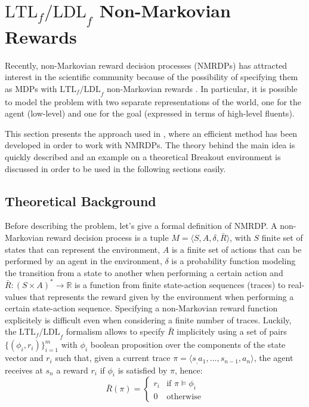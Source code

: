 \section{$\text{LTL}_f\text{/LDL}_f$ Non-Markovian Rewards}
Recently, non-Markovian reward decision processes (NMRDPs)
has attracted interest in the scientific community because of the possibility
of specifying them as MDPs with $\text{LTL}_f\text{/LDL}_f$ non-Markovian
rewards \cite{DBLP:journals/corr/abs-1807-06333}. In particular, it is possible
to model the problem with two separate representations of the world, one for
the agent (low-level) and one for the goal (expressed in terms of high-level
fluents).

This section presents the approach used in
\cite{DBLP:journals/corr/abs-1807-06333}, where an efficient method has been
developed in order to work with NMRDPs. The theory behind the main idea is
quickly described and an example on a theoretical Breakout environment is
discussed in order to be used in the following sections easily.

\subsection{Theoretical Background}
Before describing the problem, let's give a formal definition of NMRDP.
A non-Markovian reward decision process is a tuple $M = \langle S, A, \delta,
\bar{R} \rangle$, with $S$ finite set of states that can represent the
environment, $A$ is a finite set of actions that can be performed by an agent
in the environment, $\delta$ is a probability function modeling
the transition from a state to another when performing a certain action and
$\bar{R}: (S \times A)^* \rightarrow \mathbb{R}$ is a function from
finite state-action sequences (traces) to real-values that represents the
reward given by the environment when performing a certain state-action
sequence. Specifying a non-Markovian reward function explicitely is
difficult even when considering a finite number of traces. Luckily, the
$\text{LTL}_f\text{/LDL}_f$ formalism allows to specify $\bar{R}$
implicitely using a set of pairs $\{ (\phi_i, r_i) \}_{i=1}^m$ with
$\phi_i$ boolean
proposition over the components of the state vector and $r_i$ such that,
given a current trace $\pi = \langle s_, a_1, \dots, s_{n-1}, a_n \rangle$,
the agent receives at $s_n$ a reward $r_i$ if $\phi_i$ is satisfied by $\pi$,
hence:
\begin{equation}
    \bar{R}(\pi) =
        \begin{cases}
            r_i & \text{if } \pi \vDash \phi_i \\
            0 & \text{otherwise}
        \end{cases}
\end{equation}

